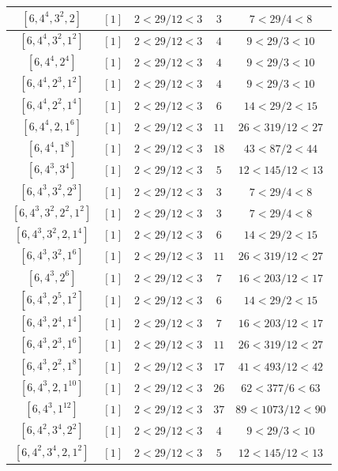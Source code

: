 \documentclass{article}%
\begin{document}
\begin{center}
\begin{longtable}{||c|c|c|c|c||}
$[6, 4^{4}, 3^{2}, 2]$ & $[1]$ & $2 < 29/12 < 3$ & $3$ & $7 < 29/4 < 8$ \\ \hline 
$[6, 4^{4}, 3^{2}, 1^{2}]$ & $[1]$ & $2 < 29/12 < 3$ & $4$ & $9 < 29/3 < 10$ \\ \hline 
$[6, 4^{4}, 2^{4}]$ & $[1]$ & $2 < 29/12 < 3$ & $4$ & $9 < 29/3 < 10$ \\ \hline 
$[6, 4^{4}, 2^{3}, 1^{2}]$ & $[1]$ & $2 < 29/12 < 3$ & $4$ & $9 < 29/3 < 10$ \\ \hline 
$[6, 4^{4}, 2^{2}, 1^{4}]$ & $[1]$ & $2 < 29/12 < 3$ & $6$ & $14 < 29/2 < 15$ \\ \hline 
$[6, 4^{4}, 2, 1^{6}]$ & $[1]$ & $2 < 29/12 < 3$ & $11$ & $26 < 319/12 < 27$ \\ \hline 
$[6, 4^{4}, 1^{8}]$ & $[1]$ & $2 < 29/12 < 3$ & $18$ & $43 < 87/2 < 44$ \\ \hline 
$[6, 4^{3}, 3^{4}]$ & $[1]$ & $2 < 29/12 < 3$ & $5$ & $12 < 145/12 < 13$ \\ \hline 
$[6, 4^{3}, 3^{2}, 2^{3}]$ & $[1]$ & $2 < 29/12 < 3$ & $3$ & $7 < 29/4 < 8$ \\ \hline 
$[6, 4^{3}, 3^{2}, 2^{2}, 1^{2}]$ & $[1]$ & $2 < 29/12 < 3$ & $3$ & $7 < 29/4 < 8$ \\ \hline 
$[6, 4^{3}, 3^{2}, 2, 1^{4}]$ & $[1]$ & $2 < 29/12 < 3$ & $6$ & $14 < 29/2 < 15$ \\ \hline 
$[6, 4^{3}, 3^{2}, 1^{6}]$ & $[1]$ & $2 < 29/12 < 3$ & $11$ & $26 < 319/12 < 27$ \\ \hline 
$[6, 4^{3}, 2^{6}]$ & $[1]$ & $2 < 29/12 < 3$ & $7$ & $16 < 203/12 < 17$ \\ \hline 
$[6, 4^{3}, 2^{5}, 1^{2}]$ & $[1]$ & $2 < 29/12 < 3$ & $6$ & $14 < 29/2 < 15$ \\ \hline 
$[6, 4^{3}, 2^{4}, 1^{4}]$ & $[1]$ & $2 < 29/12 < 3$ & $7$ & $16 < 203/12 < 17$ \\ \hline 
$[6, 4^{3}, 2^{3}, 1^{6}]$ & $[1]$ & $2 < 29/12 < 3$ & $11$ & $26 < 319/12 < 27$ \\ \hline 
$[6, 4^{3}, 2^{2}, 1^{8}]$ & $[1]$ & $2 < 29/12 < 3$ & $17$ & $41 < 493/12 < 42$ \\ \hline 
$[6, 4^{3}, 2, 1^{10}]$ & $[1]$ & $2 < 29/12 < 3$ & $26$ & $62 < 377/6 < 63$ \\ \hline 
$[6, 4^{3}, 1^{12}]$ & $[1]$ & $2 < 29/12 < 3$ & $37$ & $89 < 1073/12 < 90$ \\ \hline 
$[6, 4^{2}, 3^{4}, 2^{2}]$ & $[1]$ & $2 < 29/12 < 3$ & $4$ & $9 < 29/3 < 10$ \\ \hline 
$[6, 4^{2}, 3^{4}, 2, 1^{2}]$ & $[1]$ & $2 < 29/12 < 3$ & $5$ & $12 < 145/12 < 13$ \\ \hline 

\end{longtable}
\end{center}
\end{document}
